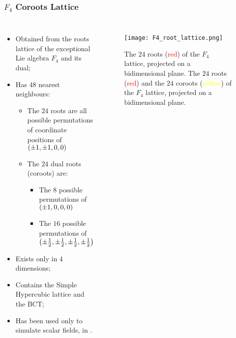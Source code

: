 \documentclass{beamer}
\begin{document}
\begin{frame}
  \frametitle{$F_4$ Coroots Lattice}
  \centering
  \begin{columns}
    \begin{itemize}
      \item[\ding{228}] Obtained from the roots lattice of the exceptional Lie algebra $F_4$ and its dual;
      \item[\ding{228}] Has $48$ nearest neighbours:
      \begin{itemize}
        \item The $24$ roots are all possible permutations of coordinate positions of $\left(\pm1,\pm1,0,0\right)$
        \vspace{0.25\baselineskip}
        \item The $24$ dual roots (coroots) are:
        \begin{itemize}
          \item[\ding{109}] The $8$ possible permutations of $\left(\pm1,0,0,0\right)$
          \item[\ding{109}] The $16$ possible permutations of $\left(\pm\frac12,\pm\frac12,\pm\frac12,\pm\frac12\right)$
        \end{itemize}
      \end{itemize}
      \item[\ding{228}] Exists only in $4$ dimensions;
      \item[\ding{228}] Contains the Simple Hypercubic lattice and the BCT;
      \item[\ding{228}] Has been used only to simulate scalar fields, in \cite{Neuberger:1987kt}.
    \end{itemize}

    \begin{figure}
      \texttt{[image: F4\_root\_lattice.png]}
      \caption{
        {The $24$ roots (\textcolor{red}{red}) of the $F_4$ lattice, projected on a bidimensional plane.\vspace{\baselineskip}}
        {The $24$ roots (\textcolor{red}{red}) and the $24$ coroots (\textcolor{yellow}{yellow}) of the $F_4$ lattice, projected on a bidimensional plane.}
      }
    \end{figure}
  \end{columns}
\end{frame}
\end{document}
